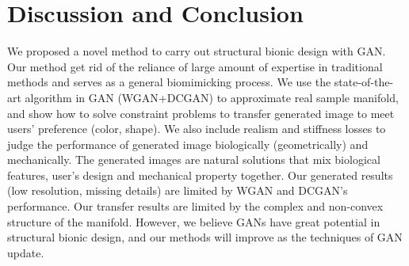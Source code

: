 \chapter{Discussion and Conclusion}

We proposed a novel method to carry out structural bionic design with GAN. Our method get rid of the reliance of large amount of expertise in traditional methods and serves as a general biomimicking process. We use the state-of-the-art algorithm in GAN (WGAN+DCGAN) to approximate real sample manifold, and show how to solve constraint problems to transfer generated image to meet users’ preference (color, shape). We also include realism and stiffness losses to judge the performance of generated image biologically (geometrically) and mechanically. The generated images are natural solutions that mix biological features, user’s design and mechanical property together. Our generated results (low resolution, missing details) are limited by WGAN and DCGAN’s performance. Our transfer results are limited by the complex and non-convex structure of the manifold. However, we believe GANs have great potential in structural bionic design, and our methods will improve as the techniques of GAN update.

